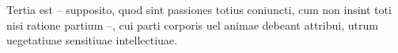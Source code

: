\documentclass{article}
\begin{document}
\newcommand{\showwordrank}[2]{#1\ifnumgreater{#2}{0}{\textsuperscript{#2}}{}}

\begin{ledgroup}

\beginnumbering

\pstart
Tertia est – supposito, quod sint passiones totius coniuncti, cum non insint toti nisi ratione partium –, cui parti corporis uel animae debeant attribui,  utrum uegetatiuae   sensitiuae 
intellectiuae.


\pend

\endnumbering
\end{ledgroup}


\makeatother
\end{document}
